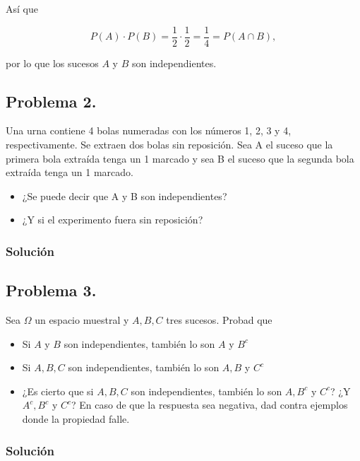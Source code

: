 \documentclass[
]{article}
\providecommand{\tightlist}{%
  \setlength{\itemsep}{0pt}\setlength{\parskip}{0pt}}
\begin{document}
Así que

\[P(A)\cdot P(B)=\frac12\cdot\frac12=\frac14=P(A\cap B),\]

por lo que los sucesos \(A\) y \(B\) son independientes.

\hypertarget{problema-2.}{%
\subsection{Problema 2.}\label{problema-2.}}

Una urna contiene 4 bolas numeradas con los números 1, 2, 3 y 4,
respectivamente. Se extraen dos bolas sin reposición. Sea A el suceso
que la primera bola extraída tenga un 1 marcado y sea B el suceso que la
segunda bola extraída tenga un 1 marcado.

\begin{itemize}
\tightlist
\item
  ¿Se puede decir que A y B son independientes?
\item
  ¿Y si el experimento fuera sin reposición?
\end{itemize}

\hypertarget{soluciuxf3n-19}{%
\subsubsection{Solución}\label{soluciuxf3n-19}}

\hypertarget{problema-3.}{%
\subsection{Problema 3.}\label{problema-3.}}

Sea \(\Omega\) un espacio muestral y \(A,B,C\) tres sucesos. Probad que

\begin{itemize}
\tightlist
\item
  Si \(A\) y \(B\) son independientes, también lo son \(A\) y \(B^c\)
\item
  Si \(A,B,C\) son independientes, también lo son \(A,B\) y \(C^c\)
\item
  ¿Es cierto que si \(A,B,C\) son independientes, también lo son
  \(A,B^c\) y \(C^c\)? ¿Y \(A^c, B^c\) y \(C^c\)? En caso de que la
  respuesta sea negativa, dad contra ejemplos donde la propiedad falle.
\end{itemize}

\hypertarget{soluciuxf3n-20}{%
\subsubsection{Solución}\label{soluciuxf3n-20}}
\end{document}
